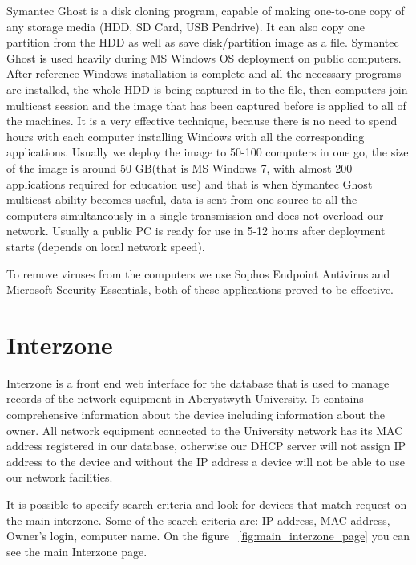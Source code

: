 \documentclass[10pt,a4paper,headinclude=true]{report}
\begin{document}
Symantec Ghost is a disk cloning program, capable of making one-to-one copy of any storage media (HDD, SD Card, USB Pendrive). It can also copy one partition from the HDD as well as save disk/partition image as a file. Symantec Ghost is used heavily during MS Windows OS deployment on public computers. After reference Windows installation is complete and all the necessary programs are installed, the whole HDD is being captured in to the file, then computers join multicast session and the image  that has been captured before is applied to all of the machines. It is a very effective technique, because there is no need to spend hours with each computer installing Windows with all the corresponding applications. Usually we deploy the image to 50-100 computers in one go, the size of the image is around 50 GB(that is MS Windows 7, with almost 200 applications required for education use) and that is when Symantec Ghost multicast ability becomes useful, data is sent from one source to all the computers simultaneously in a single transmission and does not overload our network. Usually a public PC is ready for use in 5-12 hours after deployment starts (depends on local network speed).

To remove viruses from the computers we use Sophos Endpoint Antivirus and Microsoft Security Essentials, both of these applications proved to be effective.
 
\section{Interzone}
Interzone is a front end web interface for the database that is used to manage records of the network equipment in Aberystwyth University. It contains comprehensive information about the device including information about the owner. All network equipment connected to the University network has its MAC address registered in our database, otherwise our DHCP server will not assign IP address to the device and without the IP address a device will not be able to use our network facilities.

It is possible to specify search criteria and look for devices that match request on the main interzone. Some of the search criteria are: IP address, MAC address, Owner's login, computer name. On the figure ~\ref{fig:main_interzone_page} you can see the main Interzone page.
\end{document}

